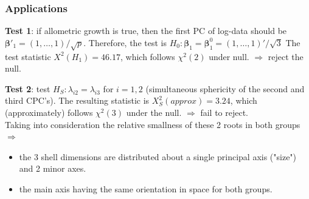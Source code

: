 \documentclass{beamer}
\begin{document}
	\begin{frame}
		\frametitle{Applications}
		\textbf{Test 1}: if allometric growth is true, then the first PC of log-data should be $\bm{\beta}'_1 = (1,\ldots,1)/\sqrt{p}$. Therefore, the test is $H_0: \bm{\beta}_1 = \bm{\beta}^0_1 = (1,\ldots,1)'/\sqrt{3}$
		The test statistic $X^2(H_1) = 46.17$, which follows $\chi^2(2)$ under null. $\Rightarrow$  reject the null.
		
		\textbf{Test 2}: test $H_S:\lambda_{i2} = \lambda_{i3}$ for $i=1,2$ (simultaneous sphericity of the second and third CPC's).
		The resulting statistic is $X_S^2(approx) = 3.24$, which (approximately) follows $\chi^2(3)$ under the null. $\Rightarrow$ fail to reject.\\
		
		Taking into consideration the relative smallness of these 2 roots in both groups
		$\Rightarrow$
		\begin{itemize}
			\item 
			the 3 shell dimensions are distributed about a single principal axis ("size") and 2 minor axes.
			\item
			the main axis having the same orientation in space for both groups.
		\end{itemize}
		
		
		
		
		
		
		
		
		
		
		
		
	\end{frame}
	
	
\end{document}
